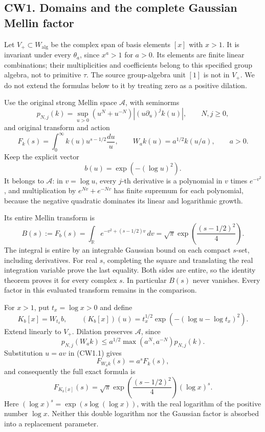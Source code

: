 \subsection{CW1. Domains and the complete Gaussian Mellin
factor}\label{cw1.-domains-and-the-complete-gaussian-mellin-factor}

Let \(V_+\subset W_{\mathrm{alg}}\) be the complex span of basis
elements \([x]\) with \(x>1\). It is invariant under every \(\theta_a\),
since \(x^a>1\) for \(a>0\). Its elements are finite linear
combinations; their multiplicities and coefficients belong to this
specified group algebra, not to primitive \(\tau\). The source
group-algebra unit \([1]\) is not in \(V_+\). We do not extend the
formulas below to it by treating zero as a positive dilation.

Use the original strong Mellin space \(\mathcal A\), with seminorms \[
p_{N,j}(k)=\sup_{u>0}(u^N+u^{-N})|(u\partial_u)^j k(u)|,
\qquad N,j\ge0,
\] and original transform and action \[
F_k(s)=\int_0^\infty k(u)u^{s-1/2}\frac{du}{u},\qquad
W_a k(u)=a^{1/2}k(u/a),\qquad a>0.
\tag{CW1.1}
\] Keep the explicit vector \[
b(u)=\exp(-(\log u)^2).
\tag{CW1.2}
\] It belongs to \(\mathcal A\): in \(v=\log u\), every \(j\)-th
derivative is a polynomial in \(v\) times \(e^{-v^2}\), and
multiplication by \(e^{Nv}+e^{-Nv}\) has finite supremum for each
polynomial, because the negative quadratic dominates its linear and
logarithmic growth.

Its entire Mellin transform is \[
B(s):=F_b(s)
=\int_{\mathbb R}e^{-v^2+(s-1/2)v}\,dv
=\sqrt{\pi}\exp\!\left(\frac{(s-1/2)^2}{4}\right).
\tag{CW1.3}
\] The integral is entire by an integrable Gaussian bound on each
compact \(s\)-set, including derivatives. For real \(s\), completing the
square and translating the real integration variable prove the last
equality. Both sides are entire, so the identity theorem proves it for
every complex \(s\). In particular \(B(s)\) never vanishes. Every factor
in this evaluated transform remains in the comparison.

For \(x>1\), put \(t_x=\log x>0\) and define \[
K_b[x]=W_{t_x}b,\qquad
(K_b[x])(u)=t_x^{1/2}
\exp\!\left(-(\log u-\log t_x)^2\right).
\tag{CW1.4}
\] Extend linearly to \(V_+\). Dilation preserves \(\mathcal A\), since
\[
p_{N,j}(W_a k)
\le a^{1/2}\max(a^N,a^{-N})p_{N,j}(k).
\] Substitution \(u=av\) in (CW1.1) gives \[
F_{W_a k}(s)=a^sF_k(s),
\] and consequently the full exact formula is \[
\boxed{F_{K_b[x]}(s)=
\sqrt{\pi}\exp\!\left(\frac{(s-1/2)^2}{4}\right)(\log x)^s.}
\tag{CW1.5}
\] Here \((\log x)^s=\exp(s\log(\log x))\), with the real logarithm of
the positive number \(\log x\). Neither this double logarithm nor the
Gaussian factor is absorbed into a replacement parameter.


